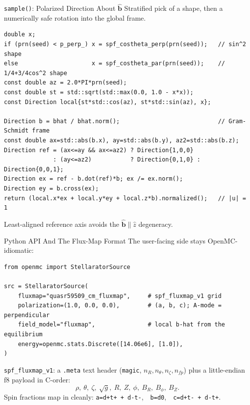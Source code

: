 \documentclass[11pt,aspectratio=169]{beamer}
\newcommand{\bhat}{\hat{\mathbf{b}}}
\begin{document}
\begin{frame}[fragile]{\texttt{sample()}: Polarized Direction About $\bhat$}
Stratified pick of a shape, then a numerically safe rotation into the global frame.
\begin{verbatim}
double x;
if (prn(seed) < p_perp_) x = spf_costheta_perp(prn(seed));   // sin^2 shape
else                     x = spf_costheta_par(prn(seed));    // 1/4+3/4cos^2 shape
const double az = 2.0*PI*prn(seed);
const double st = std::sqrt(std::max(0.0, 1.0 - x*x));
const Direction local{st*std::cos(az), st*std::sin(az), x};

Direction b = bhat / bhat.norm();                            // Gram-Schmidt frame
const double ax=std::abs(b.x), ay=std::abs(b.y), az2=std::abs(b.z);
Direction ref = (ax<=ay && ax<=az2) ? Direction{1,0,0}
              : (ay<=az2)           ? Direction{0,1,0} : Direction{0,0,1};
Direction ex = ref - b.dot(ref)*b; ex /= ex.norm();
Direction ey = b.cross(ex);
return (local.x*ex + local.y*ey + local.z*b).normalized();   // |u| = 1
\end{verbatim}
\footnotesize Least-aligned reference axis avoids the $\bhat\parallel\hat z$ degeneracy.
\end{frame}

\begin{frame}[fragile]{Python API And The Flux-Map Format}
The user-facing side stays OpenMC-idiomatic:
\begin{verbatim}
from openmc import StellaratorSource

src = StellaratorSource(
    fluxmap="quasr59509_cm_fluxmap",     # spf_fluxmap_v1 grid
    polarization=(1.0, 0.0, 0.0),        # (a, b, c); A-mode = perpendicular
    field_model="fluxmap",               # local b-hat from the equilibrium
    energy=openmc.stats.Discrete([14.06e6], [1.0]),
)
\end{verbatim}
\texttt{spf\_fluxmap\_v1}: a \texttt{.meta} text header (\texttt{magic},
$n_R,n_\theta,n_\zeta,n_{fp}$) plus a little-endian f8 payload in C-order:
\[
\rho,\ \theta,\ \zeta,\ \sqrt{g},\ R,\ Z,\ \phi,\ B_R,\ B_\phi,\ B_Z .
\]
Spin fractions map in cleanly: \texttt{a=d+t+ + d-t-},\ \ \texttt{b=d0},\ \
\texttt{c=d+t- + d-t+}.
\end{frame}
\end{document}

